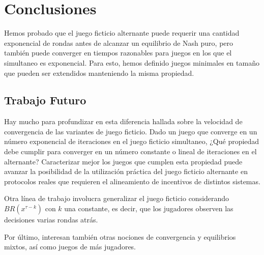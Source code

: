 \chapter{Conclusiones}  \label{cap:conclusiones}

Hemos probado que el juego ficticio alternante puede requerir una cantidad exponencial de rondas antes de alcanzar un equilibrio de Nash puro, pero también puede converger en tiempos razonables para juegos en los que el simultaneo es exponencial. Para esto, hemos definido juegos minimales en tamaño que pueden ser extendidos manteniendo la misma propiedad.

\section{Trabajo Futuro} 

Hay mucho para profundizar en esta diferencia hallada sobre la velocidad de convergencia de las variantes de juego ficticio. Dado un juego que converge en un número exponencial de iteraciones en el juego ficticio simultaneo, ¿Qué propiedad debe cumplir para converger en un número constante o lineal de iteraciones en el alternante? Caracterizar mejor los juegos que cumplen esta propiedad puede avanzar la posibilidad de la utilización práctica del juego ficticio alternante en protocolos reales que requieren el alineamiento de incentivos de distintos sistemas.

Otra línea de trabajo involucra generalizar el juego ficticio considerando $BR(x^{\tau-k})$ con $k$ una constante, es decir, que los jugadores observen las decisiones varias rondas atrás.

Por último, interesan también otras nociones de convergencia y equilibrios mixtos, así como juegos de más jugadores.
